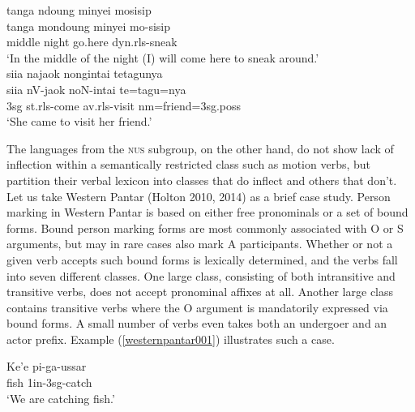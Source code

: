 \ea \label{tajio001}
\gll tanga ndoung minyei mosisip \\
tanga mondoung minyei mo-sisip \\
\glc middle night go.here \acs{dyn}.\acs{rls}-sneak \\
\glft `In the middle of the night (I) will come here to sneak around.’ \\ 
\z
\xe
\ea \label{tajio002}
\gll siia najaok nongintai tetagunya \\
siia nV-jaok noN-intai te=tagu=nya \\
\glc \acs{3}\acs{sg} \acs{st}.\acs{rls}-come \acs{av}.\acs{rls}-visit \acs{nm}=friend=\acs{3}\acs{sg}.\acs{poss} \\
\glft `She came to visit her friend.’ \\ 
\z
\xe

The languages from the \textsc{nus} subgroup, on the other hand, do not show lack of inflection within a semantically restricted class such as motion verbs, but partition their verbal lexicon into classes that do inflect and others that don't. Let us take Western Pantar (Holton 2010, 2014) as a brief case study. Person marking in Western Pantar is based on either free pronominals or a set of bound forms. Bound person marking forms are most commonly associated with O or S arguments, but may in rare cases also mark A participants. Whether or not a given verb accepts such bound forms is lexically determined, and the verbs fall into seven different classes. One large class, consisting of both intransitive and transitive verbs, does not accept pronominal affixes at all. Another large class contains transitive verbs where the O argument is mandatorily expressed via bound forms. A small number of verbs even takes both an undergoer and an actor prefix. Example (\ref{westernpantar001}) illustrates such a case.

\ea \label{westernpantar001}
\gll Ke'e pi-ga-ussar \\
fish 1\acs{in}-3\acs{sg}-catch \\
\glft `We are catching fish.' \\ 
\z
\xe

